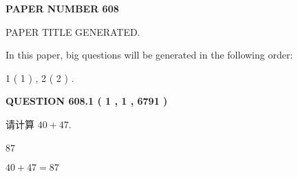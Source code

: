 \documentclass{ctexart}
\begin{document}
   
   
   
\newpage 
\setcounter{page}{ 
   608001 } 
   
   
   
   
 {\textbf{ \Large{ PAPER NUMBER  608  }}}
   
   
\vspace{0.2in}
   
   
   
   
   
   
   
   
 \vspace{0.2in}
 
 
 
 
   
   
 PAPER TITLE GENERATED.
   
   
   
\vspace{0.2in}
   
In this paper, big questions will be generated in the following order: 
   
   
   1 ( 1 )
 ,
   2 ( 2 )
 .
  
\vspace{0.2in}
  
{\textbf{\Large{QUESTION
608.1 
 ( 1 , 1 , 6791 )
}}}
  
  
 
请计算 $ %
40 +  %
47 $.
 
 
 
\noindent{}
 
 

87
 
 
\noindent{}
 
 

 
 
 
\noindent{}
 
 

$ %
40 +  %
47=   %
87$
 
 
\noindent{}
 
 

 
   
   
   
\end{document}
